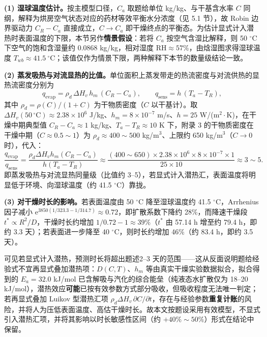 \documentclass[12pt,a4paper]{ctexart}
\begin{document}
\textbf{(1) 湿球温度估计。}按主模型口径，$C_a$ 取题给单位 kg/kg、与干基含水率 $C$ 同纲，解释为烘房空气状态对应的药材等效平衡水分浓度（见 5.1 节），故 Robin 边界驱动力 $C_R-C_a$ 直接成立，$C\to C_a$ 即干燥终点的平衡态。为估计显式计入潜热时表面温度的下限，本节另作\textbf{情景假设}：若将 $C_a$ 按空气含湿比解释，则 50 $^\circ$C 下空气的饱和含湿量约 0.0868 kg/kg\cite{incropera}，相对湿度 $\mathrm{RH}\approx57\%$，由焓湿图求得湿球温度 $T_{wb}\approx41.5\ ^\circ$C；该值仅作为情景下限，两种解释下本节的数量级结论一致。

\textbf{(2) 蒸发吸热与对流显热的比值。}单位面积上蒸发带走的热流密度与对流供热的显热流密度分别为
\begin{equation}
q_{\mathrm{evap}}=\rho_d\,\Delta H_v\,h_m\,(C_R-C_a),\qquad q_{\mathrm{sens}}=h\,(T_a-T_R),
\label{eq:qratio}
\end{equation}
其中 $\rho_d=\rho(C)/(1+C)$ 为干物质密度（$C$ 以干基计）。取 $\Delta H_v(50\,^\circ\mathrm{C})\approx2.38\times10^6$ J/kg\cite{incropera}、$h_m=8\times10^{-7}$ m/s、$h=25$ W/(m$^2\!\cdot$K)，在干燥中期典型值 $C_R-C_a\approx1$ kg/kg、$T_a-T_R\approx10$ K 下，附录 3 的干物质密度在干燥中期（$C\approx0.5\sim1$）为 $\rho_d\approx400\sim500$ kg/m$^3$、上限约 650 kg/m$^3$（$C\to0$ 时），代入：
\begin{equation}
\frac{q_{\mathrm{evap}}}{q_{\mathrm{sens}}}
=\frac{\rho_d\Delta H_v h_m(C_R-C_a)}{h(T_a-T_R)}
\approx\frac{(400\sim650)\times2.38\times10^6\times8\times10^{-7}\times1}{25\times10}\approx3\sim5.
\end{equation}
即蒸发吸热与对流显热同量级（比值约 3--5），若显式计入潜热汇，表面温度将明显低于环境、向湿球温度（约 41.5 $^\circ$C）靠拢。

\textbf{(3) 对干燥时长的影响。}若表面温度由 50 $^\circ$C 降至湿球温度约 41.5 $^\circ$C，Arrhenius 因子减小 $\mathrm{e}^{3850(1/323.3-1/314.7)}\approx0.72$，即扩散系数下降约 28\%，而降速干燥段 $t^*\propto R^2/D$，干燥时长约增加 $1/0.72-1\approx39\%$（$t^*$ 由 57.14 h 增至约 79.4 h，即约 3.3 天）；若表面进一步降至 40 $^\circ$C，则时长约增加 46\%（约 83.4 h，即约 3.5 天）。

可见若显式计入潜热，预测时长将超出题述2--3 天的范围——这从反面说明题给经验式不宜再显式叠加潜热项：$D(C,T)$、$h_m$ 等由真实干燥实验数据拟合，拟合得到的 $E_a=32.0$ kJ/mol 已含解吸与汽化的综合能垒（纯液态水扩散仅为 18--20 kJ/mol），潜热效应\textbf{可能}已按有效参数方式部分吸收，但吸收程度无法唯一判定；若再显式叠加 Luikov 型潜热汇项 $\rho_d\Delta H_v\,\partial C/\partial t$，存在与经验参数\textbf{重复计账}的风险，并将人为压低表面温度、高估干燥时长。故本文按题设采用有效模型，不显式引入潜热汇项，并将其影响以时长敏感性区间（约 $+40\%\sim50\%$）形式在结论中保留。
\end{document}

